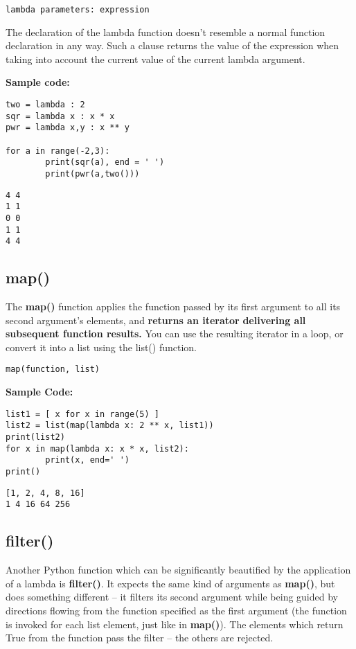 \documentclass[11pt]{article}
\begin{document}
\texttt{lambda parameters: expression}

The declaration of the lambda function doesn’t resemble a normal
function declaration in any way.  Such a clause returns the value of
the expression when taking into account the current value of the
current lambda argument.

\vspace{10 mm}

\textbf{Sample code:}

\begin{verbatim}
two = lambda : 2
sqr = lambda x : x * x
pwr = lambda x,y : x ** y

for a in range(-2,3):
        print(sqr(a), end = ' ')
        print(pwr(a,two()))
\end{verbatim}

\begin{verbatim}
4 4
1 1
0 0
1 1
4 4
\end{verbatim}
\subsection{map()}
\label{sec:org7e1172e}
The \textbf{map()} function applies the function passed by its first argument
to all its second argument’s elements, and \textbf{returns an iterator}
\textbf{delivering all subsequent function results.} You can use the resulting
iterator in a loop, or convert it into a list using the list()
function.

\texttt{map(function, list)}

\textbf{Sample Code:}

\begin{verbatim}
list1 = [ x for x in range(5) ]
list2 = list(map(lambda x: 2 ** x, list1))
print(list2)
for x in map(lambda x: x * x, list2):
        print(x, end=' ')
print()
\end{verbatim}

\begin{verbatim}
[1, 2, 4, 8, 16]
1 4 16 64 256 
\end{verbatim}
\subsection{filter()}
\label{sec:org802c8dc}
Another Python function which can be significantly beautified by the
application of a lambda is \textbf{filter()}. It expects the same kind of
arguments as \textbf{map()}, but does something different – it filters its
second argument while being guided by directions flowing from the
function specified as the first argument (the function is invoked for
each list element, just like in \textbf{map()}).  The elements which return
True from the function pass the filter – the others are rejected.
\end{document}
